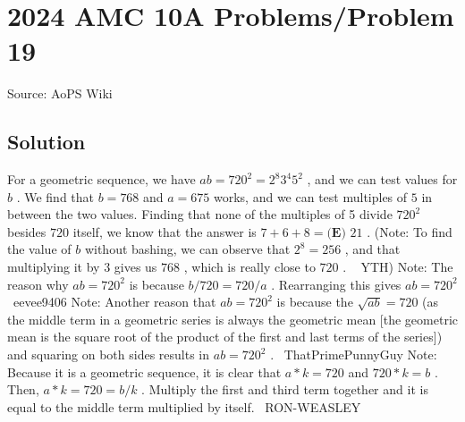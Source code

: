 \documentclass[12pt]{article}
\begin{document}
\section*{{2024 AMC 10A Problems/Problem 19}}
Source: AoPS Wiki

\subsection*{Solution}
For a geometric sequence, we have $ab=720^2=2^8 3^4 5^2$ , and we can test values for $b$ . We find that $b=768$ and $a=675$ works, and we can test multiples of $5$ in between the two values. Finding that none of the multiples of 5 divide $720^2$ besides $720$ itself, we know that the answer is $7+6+8=\boxed{\textbf{(E) } 21}$ . (Note: To find the value of $b$ without bashing, we can observe that $2^8=256$ , and that multiplying it by $3$ gives us $768$ , which is really close to $720$ . ~ YTH) Note: The reason why $ab=720^2$ is because $b/720 = 720/a$ . Rearranging this gives $ab = 720^2$ ~eevee9406 Note: Another reason that $ab=720^2$ is because the $\sqrt{ab}=720$ (as the middle term in a geometric series is always the geometric mean [the geometric mean is the square root of the product of the first and last terms of the series]) and squaring on both sides results in $ab=720^2$ . ~ThatPrimePunnyGuy Note: Because it is a geometric sequence, it is clear that $a*k = 720$ and $720*k = b$ . Then, $a*k = 720 = b/k$ . Multiply the first and third term together and it is equal to the middle term multiplied by itself. ~RON-WEASLEY
\end{document}

